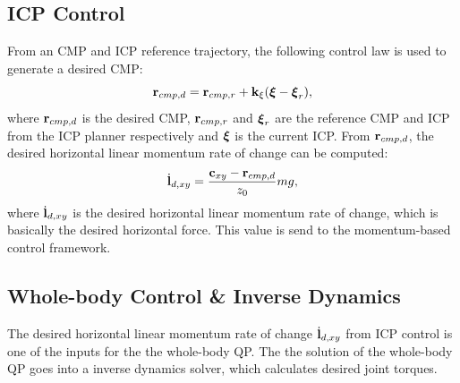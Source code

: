 \subsection{ICP Control}
From an \ac{CMP} and \ac{ICP} reference trajectory, the following control law is used to generate a desired \ac{CMP}:
\begin{equation}
    \mathbf{r}_{cmp,d}=\mathbf{r}_{cmp,r} + \mathbf{k}_{\xi}(\boldsymbol{\xi}-\boldsymbol{\xi}_r),
\end{equation}
where $\mathbf{r}_{cmp,d}$ is the desired \ac{CMP}, $\mathbf{r}_{cmp,r}$ and $\boldsymbol{\xi}_r$ are the reference \ac{CMP} and \ac{ICP} from the \ac{ICP} planner respectively and $\boldsymbol{\xi}$ is the current \ac{ICP}. From $\mathbf{r}_{cmp,d}$, the desired horizontal linear momentum rate of change can be computed:
\begin{equation}\label{eq:dotldxy}
    \dot{\mathbf{l}}_{d,xy} = \frac{\mathbf{c}_{xy}-\mathbf{r}_{cmp,d}}{z_0}mg,
\end{equation}
where $\dot{\mathbf{l}}_{d,xy}$ is the desired horizontal linear momentum rate of change, which is basically the desired horizontal force. This value is send to the momentum-based control framework. 
\subsection{Whole-body Control \& Inverse Dynamics}
The desired horizontal linear momentum rate of change $\dot{\mathbf{l}}_{d,xy}$ from \ac{ICP} control is one of the inputs for the the whole-body \ac{QP}. The the solution of the whole-body \ac{QP} goes into a inverse dynamics solver, which calculates desired joint torques. 

